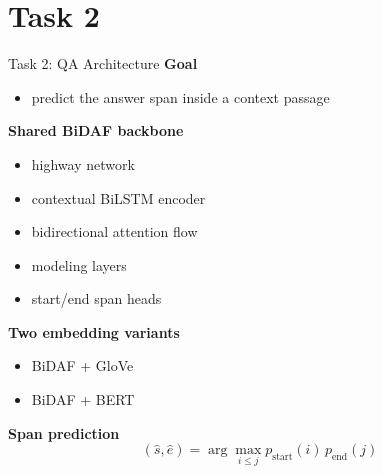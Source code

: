 \documentclass{beamer}
\begin{document}
\section{Task 2}

\begin{frame}{Task 2: QA Architecture}
\small
\textbf{Goal}
\begin{itemize}
  \item predict the answer span inside a context passage
\end{itemize}

\vspace{0.3em}
\textbf{Shared BiDAF backbone}
\begin{itemize}
  \item highway network
  \item contextual BiLSTM encoder
  \item bidirectional attention flow
  \item modeling layers
  \item start/end span heads
\end{itemize}

\vspace{0.3em}
\textbf{Two embedding variants}
\begin{itemize}
  \item BiDAF + GloVe
  \item BiDAF + BERT
\end{itemize}

\vspace{0.3em}
\textbf{Span prediction}
\[
(\hat{s},\hat{e})=\arg\max_{i\leq j} p_{\text{start}}(i)\,p_{\text{end}}(j)
\]
\end{frame}
\end{document}
